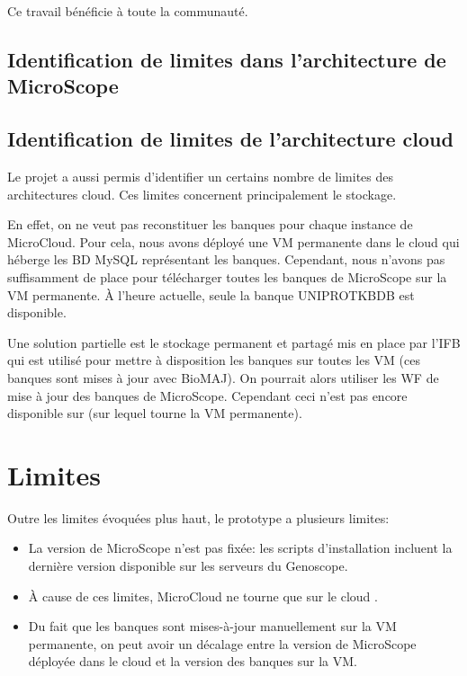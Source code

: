 Ce travail bénéficie à toute la communauté.

\subsection{Identification de limites dans l'architecture de MicroScope}


\subsection{Identification de limites de l'architecture cloud}

Le projet a aussi permis d'identifier un certains nombre de limites des architectures cloud.
Ces limites concernent principalement le stockage.

En effet, on ne veut pas reconstituer les banques pour chaque instance de MicroCloud.
Pour cela, nous  avons déployé une VM permanente dans le cloud 
qui héberge les BD MySQL représentant les banques.
Cependant, nous n'avons pas suffisamment de place pour télécharger toutes les banques de MicroScope sur la VM permanente.
À l'heure actuelle, seule la banque UNIPROTKBDB est disponible.

Une solution partielle est le stockage permanent et partagé mis en place par l'IFB
qui est utilisé pour mettre à disposition les banques sur toutes les VM (ces banques sont mises à jour avec BioMAJ).
On pourrait alors utiliser les WF de mise à jour des banques de MicroScope.
Cependant ceci n'est pas encore disponible sur  (sur lequel tourne la VM permanente).

\section{Limites}

Outre les limites évoquées plus haut, le prototype a plusieurs limites:
\begin{itemize}
	\item La version de MicroScope n'est pas fixée: les scripts d'installation incluent la dernière version disponible sur les serveurs du Genoscope.
	\item À cause de ces limites, MicroCloud ne tourne que sur le cloud .
	\item Du fait que les banques sont mises-à-jour manuellement sur la VM permanente, on peut avoir un décalage entre la version de MicroScope déployée dans le cloud
	et la version des banques sur la VM.
\end{itemize}

